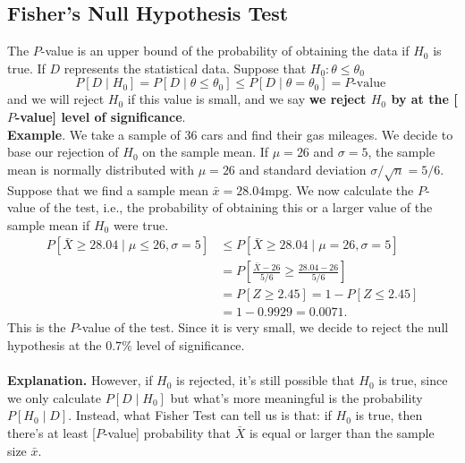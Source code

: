 \documentclass[a4paper,12pt]{article}
\begin{document}
\subsection{Fisher's Null Hypothesis Test}
The $P$-value is an upper bound of the probability of obtaining the data if $H_0$ is true. If $D$ represents the statistical data. Suppose that $H_0: \theta \leq \theta_0$
\begin{equation}
P[D \mid H_0] = P[D \mid \theta \leq \theta_0] \leq  P[D \mid \theta =\theta_0] = P \text {-value }
\end{equation}
and we will reject $H_0$ if this value is small, and we say \textbf{we reject $H_0$ by at the [$P$-value] level of significance}.\\
\textbf{Example}. We take a sample of 36 cars and find their gas mileages. We decide to base our rejection of $H_0$ on the sample mean.
If $\mu=26$ and $\sigma=5$, the sample mean is normally distributed with $\mu=26$ and standard deviation $\sigma / \sqrt{n}=5 / 6$.
Suppose that we find a sample mean $\bar{x}=28.04 \mathrm{mpg}$.
We now calculate the $P$-value of the test, i.e., the probability of obtaining this or a larger value of the sample mean if $H_0$ were true.
$$
\begin{aligned}
P[\bar{X} \geq 28.04 \mid \mu \leq 26, \sigma=5] & \leq P[\bar{X} \geq 28.04 \mid \mu=26, \sigma=5] \\
& =P\left[\frac{\bar{X}-26}{5 / 6} \geq \frac{28.04-26}{5 / 6}\right] \\
& =P[Z \geq 2.45]=1-P[Z \leq 2.45] \\
& =1-0.9929=0.0071 .
\end{aligned}
$$
This is the $P$-value of the test. Since it is very small, we decide to reject the null hypothesis at the $0.7 \%$ level of significance.\\
~\\
\noindent\textbf{Explanation.} However, if $H_0$ is rejected, it's still possible that $H_0$ is true, since we only calculate $P[D\mid H_0]$ but what's more meaningful is the probability $P[H_0\mid D]$. Instead, what Fisher Test can tell us is that: if $H_0$ is true, then there's at least [$P$-value] probability that $\bar{X}$ is equal or larger than the sample size $\bar{x}$. 
\end{document}
